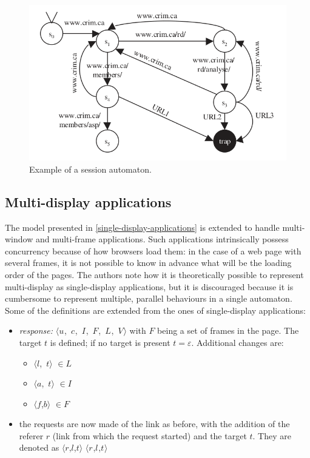 \documentclass[a4paper,10pt]{article}
\newcommand{\tuple}[1]{\mbox{$\langle$#1$\rangle$}}
\newcommand{\reqmulti}[1][]{
  \ifthenelse{\equal{#1}{}} {\mbox{$\langle r$,$l$,$t\rangle$}}
  {\mbox{$\langle r_{#1}$,$l_{#1}$,$t_{#1}\rangle$}}
}
\newcommand{\resmulti}[1][]{
  \ifthenelse{\equal{#1}{}}{\mbox{$\langle u$, $c$, $I$, $F$, $L$, $V\rangle$}}
  {\mbox{$\langle u_{#1}$, $c_{#1}$, $I_{#1}$, $F_{#1}$, $L_{#1}$, $V_{#1}\rangle$}}
}
\theoremstyle{plain} %
\theoremstyle{definition}
\theoremstyle{remark}
\begin{document}
\begin{figure}[h]
  \includegraphics[width=\textwidth]{img/session_automaton_example.png}
  \caption{Example of a session automaton.}
  \label{fig:example-session-automaton}
\end{figure}

\subsection{Multi-display applications}

The model presented in \cref{single-display-applications} is extended to handle multi-window and multi-frame applications. Such applications intrinsically possess concurrency because of how browsers load them: in the case of a web page with several frames, it is not possible to know in advance what will be the loading order of the pages. The authors note how it is theoretically possible to represent multi-display as single-display applications, but it is discouraged because it is cumbersome to represent multiple, parallel behaviours in a single automaton. Some of the definitions are extended from the ones of single-display applications:

\begin{itemize}
  \item \textit{response:} \resmulti with $F$ being a set of frames in the page. The target $t$ is defined; if no target is present $t = \varepsilon$. Additional changes are:
    \begin{itemize}
      \item \tuple{$l$, $t$} $\in L$
      \item \tuple{$a$, $t$} $\in I$
      \item \tuple{$f$,$b$} $\in F$
    \end{itemize}
  \item the requests are now made of the link as before, with the addition of the referer $r$ (link from which the request started) and the target $t$. They are denoted as \reqmulti
\end{itemize}
\end{document}
